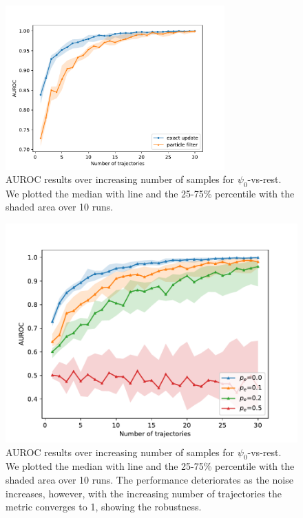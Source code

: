 \begin{figure}[t]
	\begin{center}
		\includegraphics[width=0.75\textwidth]{figures/roc_analysis/AUROC_perc_0}
		\caption[AUROC results over increasing number of samples]{AUROC results over increasing number of samples for $ \psi_0 $-vs-rest. We plotted the median with line and the 25-75\% percentile with the shaded area over 10 runs.}
		\label{fig:AUROC_class0}
	\end{center}
\end{figure}

\begin{figure}[t]
	\begin{center}
		\includegraphics[width=.75\textwidth]{figures/roc_analysis/error_AUROC_perc_0}
		\caption[AUROC results over increasing number of samples with different error probability $ p_e $]{AUROC results over increasing number of samples for $ \psi_0 $-vs-rest. We plotted the median with line and the 25-75\% percentile with the shaded area over 10 runs. The performance deteriorates as the noise increases, however, with the increasing number of trajectories the metric converges to 1, showing the robustness.}
		\label{fig:AUROC_class0_error}
	\end{center}
\end{figure}
